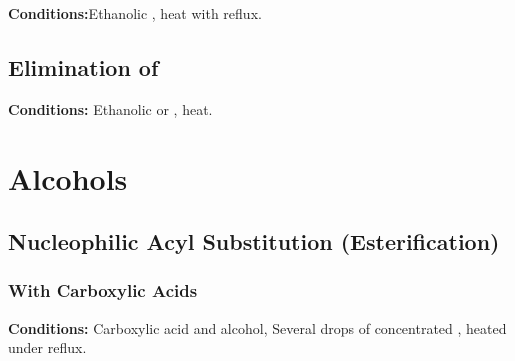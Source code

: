 			\vspace{1.5em}
			\vbox{\textbf{Conditions:}\tabto{35mm}Ethanolic , heat with reflux.}





		\subsection{Elimination of }

			\vspace{1.5em}
			\vbox{\textbf{Conditions:}	\tabto{35mm}Ethanolic  or , heat.}







	\pagebreak
	\section{Alcohols}

		\subsection{Nucleophilic Acyl Substitution (Esterification)}

			\subsubsection{With Carboxylic Acids}

				\vspace{1.5em}
				\vbox{\textbf{Conditions:}	\tabto{35mm}Carboxylic acid and alcohol,
											\tabto{35mm}Several drops of concentrated , heated under reflux.}

